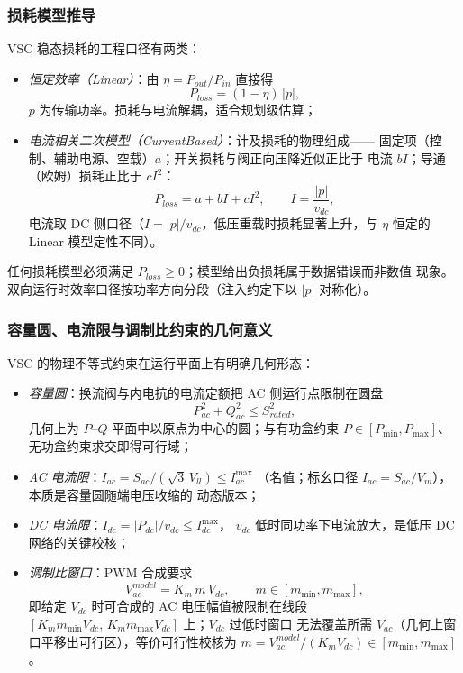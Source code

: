\subsubsection{损耗模型推导}
VSC 稳态损耗的工程口径有两类：
\begin{itemize}
  \item \emph{恒定效率（Linear）}：由 $\eta=P_{out}/P_{in}$ 直接得
        \begin{equation}
        P_{loss}=(1-\eta)\,|p|,
        \end{equation}
        $p$ 为传输功率。损耗与电流解耦，适合规划级估算；
  \item \emph{电流相关二次模型（CurrentBased）}：计及损耗的物理组成——
        固定项（控制、辅助电源、空载）$a$；开关损耗与阀正向压降近似正比于
        电流 $bI$；导通（欧姆）损耗正比于 $cI^{2}$：
        \begin{equation}
        P_{loss}=a+bI+cI^{2},\qquad I=\frac{|p|}{v_{dc}},
        \end{equation}
        电流取 DC 侧口径（$I=|p|/v_{dc}$，低压重载时损耗显著上升，与
        $\eta$ 恒定的 Linear 模型定性不同）。
\end{itemize}
任何损耗模型必须满足 $P_{loss}\ge0$；模型给出负损耗属于数据错误而非数值
现象。双向运行时效率口径按功率方向分段（注入约定下以 $|p|$ 对称化）。

\subsubsection{容量圆、电流限与调制比约束的几何意义}
VSC 的物理不等式约束在运行平面上有明确几何形态：
\begin{itemize}
  \item \emph{容量圆}：换流阀与内电抗的电流定额把 AC 侧运行点限制在圆盘
        \begin{equation}
        P_{ac}^{2}+Q_{ac}^{2}\le S_{rated}^{2},
        \end{equation}
        几何上为 $P$--$Q$ 平面中以原点为中心的圆；与有功盒约束
        $P\in[P_{\min},P_{\max}]$、无功盒约束求交即得可行域；
  \item \emph{AC 电流限}：$I_{ac}=S_{ac}/(\sqrt3\,V_{ll})\le I_{ac}^{\max}$
        （名值；标幺口径 $I_{ac}=S_{ac}/V_m$），本质是容量圆随端电压收缩的
        动态版本；
  \item \emph{DC 电流限}：$I_{dc}=|P_{dc}|/v_{dc}\le I_{dc}^{\max}$，
        $v_{dc}$ 低时同功率下电流放大，是低压 DC 网络的关键校核；
  \item \emph{调制比窗口}：PWM 合成要求
        \begin{equation}
        V_{ac}^{model}=K_m\,m\,V_{dc},\qquad m\in[m_{\min},m_{\max}],
        \end{equation}
        即给定 $V_{dc}$ 时可合成的 AC 电压幅值被限制在线段
        $[K_m m_{\min}V_{dc},\,K_m m_{\max}V_{dc}]$ 上；$V_{dc}$ 过低时窗口
        无法覆盖所需 $V_{ac}$（几何上窗口平移出可行区），等价可行性校核为
        $m=V_{ac}^{model}/(K_mV_{dc})\in[m_{\min},m_{\max}]$。
\end{itemize}


